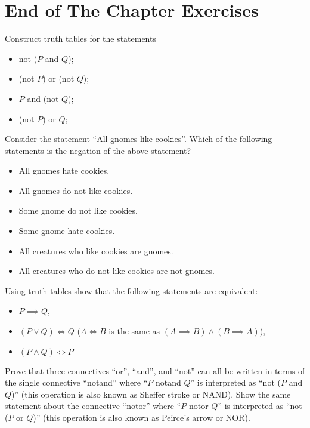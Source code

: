 \section*{End of The Chapter Exercises}
\begin{exercises}
  \exercise Construct truth tables for the statements
    \begin{itemize}
      \item not ($P$ and $Q$);
      \item (not $P$) or (not $Q$);
      \item $P$ and (not $Q$);
      \item (not $P$) or $Q$;
    \end{itemize}
  \exercise Consider the statement ``All gnomes like cookies''. Which of
    the following statements is the negation of the above statement?
    \begin{itemize}
      \item All gnomes hate cookies.
      \item All gnomes do not like cookies.
      \item Some gnome do not like cookies.
      \item Some gnome hate cookies.
      \item All creatures who like cookies are gnomes.
      \item All creatures who do not like cookies are not gnomes.
    \end{itemize}
  \exercise Using truth tables show that the following statements are
    equivalent:
    \begin{itemize}
      \item $P \implies Q$,
      \item $(P \lor Q) \iff Q$
        ($A \iff B$ is the same as $(A \implies B) \land (B \implies A)$),
      \item $(P \land Q) \iff P$
    \end{itemize}
  \exercise Prove that three connectives ``or'', ``and'', and ``not'' can
    all be written in terms of the single connective ``notand'' where ``$P$
    notand $Q$'' is interpreted as ``not ($P$ and $Q$)'' (this operation is
    also known as Sheffer stroke or NAND).
  \exercise Show the same statement about the connective ``notor'' where
    ``$P$ notor $Q$'' is interpreted as ``not ($P$ or $Q$)'' (this operation is
    also known as Peirce's arrow or NOR).
\end{exercises}
